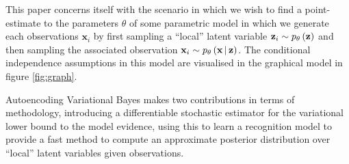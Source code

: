 \documentclass[../report.tex]{subfiles}
\begin{document}
This paper concerns itself with the scenario in which we wish to find a point-estimate to the parameters $\theta$ of some parametric model in which we generate each observations $\mathbf{x}_i$ by first sampling a ``local'' latent variable $\mathbf{z}_i \sim p_\theta \left( \mathbf{z}\right)$ and then sampling the associated observation $\mathbf{x}_i \sim p_\theta \left(\mathbf{x} \, \middle\vert \, \mathbf{z} \right)$. The conditional independence assumptions in this model are visualised in the graphical model in figure \ref{fig:graph}.

\begin{center}
\end{center}

Autoencoding Variational Bayes makes two contributions in terms of methodology, introducing a differentiable stochastic estimator for the variational lower bound to the model evidence, using this to learn a recognition model to provide a fast method to compute an approximate posterior distribution over ``local'' latent variables given observations.
\end{document}
